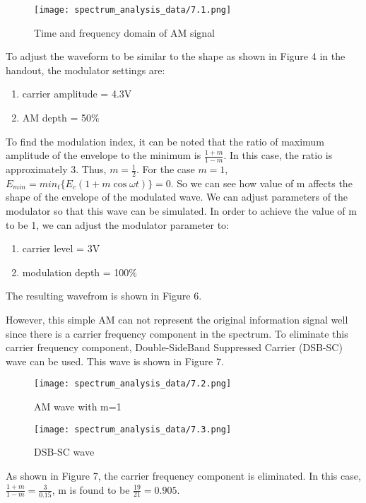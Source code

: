 \documentclass[12pt]{article}[times]
\begin{document}
\begin{figure}[h]
  \centering
  \texttt{[image: spectrum\_analysis\_data/7.1.png]}
  \caption{Time and frequency domain of AM signal}
\end{figure}
To adjust the waveform to be similar to the shape as shown in
Figure 4 in the handout, the modulator settings are: 
\begin{enumerate}
  \item carrier amplitude = 4.3V
  \item AM depth = 50$\%$
\end{enumerate}
To find the modulation index, it can be noted that 
the ratio of maximum amplitude of the envelope to the 
minimum is $\frac{1+m}{1-m}$. In this case, the ratio is approximately 3.
Thus, $m = \frac{1}{2}$.
\newline
For the case $m=1$, $E_{min} = min_t\{E_c(1+m\cos{\omega t})\} = 0$.
So we can see how value of m affects the shape of the envelope of 
the modulated wave. We can adjust parameters of the modulator so that 
this wave can be simulated. 
In order to achieve the value of m to be 1, we can adjust the
modulator parameter to:
\begin{enumerate}
  \item carrier level = 3V
  \item modulation depth = 100$\%$
\end{enumerate}
The resulting wavefrom is shown in Figure 6.

However, this simple AM can not represent the original
information signal well since there is a carrier 
frequency component in the spectrum. To eliminate this carrier
frequency component, Double-SideBand Suppressed Carrier (DSB-SC)
wave can be used. This wave is shown in Figure 7.
\noindent %
\begin{figure}[h]
  \centering
  \begin{minipage}{0.45\textwidth}
    \texttt{[image: spectrum\_analysis\_data/7.2.png]}
    \caption{AM wave with m=1}
  \end{minipage}
  \hfill %
  \begin{minipage}{0.45\textwidth}
    \texttt{[image: spectrum\_analysis\_data/7.3.png]}
    \caption{DSB-SC wave}
  \end{minipage}
\end{figure}
As shown in Figure 7, the carrier frequency component is eliminated.
In this case, $\frac{1+m}{1-m}=\frac{3}{0.15}$, m is found to be $\frac{19}{21}=0.905$.
\end{document}
